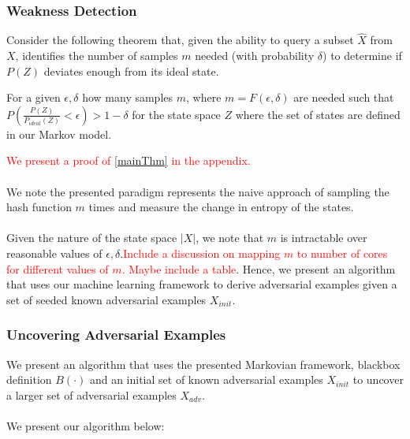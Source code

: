 \subsubsection{Weakness Detection}
Consider the following theorem that, given the ability to query a subset $\hat{X}$ from $X$, identifies the number of samples $m$ needed (with probability $\delta$) to determine if $P(Z)$ deviates enough from its ideal state. 

\begin{theorem}
\label{mainThm}
For a given $\epsilon, \delta$ how many samples $m$, where $m = F(\epsilon, \delta)$ are needed such that $P(\frac{P(Z)}{P_{ideal}(Z)}< \epsilon) > 1 - \delta$ for the state space $Z$ where the set of states are defined in our Markov model. 
\end{theorem}

\textcolor{red}{We present a proof of \ref{mainThm} in the appendix.}
\\
\\
We note the presented paradigm represents the naive approach of sampling the hash function $m$ times and measure the change in entropy of the states. 
\\
\\
Given the nature of the state space $|X|$, we note that $m$ is intractable over reasonable values of $\epsilon, \delta$.\textcolor{red}{Include a discussion on mapping $m$ to number of cores for different values of $m$. Maybe include a table}. Hence, we present an algorithm that uses our machine learning framework to derive adversarial examples given a set of seeded known adversarial examples $X_{init}$. 


\subsubsection{Uncovering Adversarial Examples}
We present an algorithm that uses the presented Markovian framework, blackbox definition $B(\cdot)$ and an initial set of known adversarial examples $X_{init}$ to uncover a larger set of adversarial examples $X_{adv}$. 
\\
\\
We present our algorithm below:


